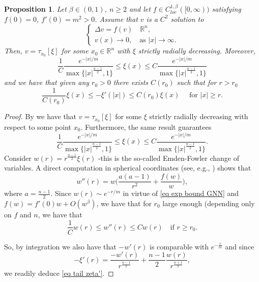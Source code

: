 \documentclass[11pt,letterpaper,reqno]{amsart}
\newcommand{\R}{\mathbb{R}}
\theoremstyle{plain}%
\newtheorem{proposition}[theorem]{Proposition}
\theoremstyle{definition}
\numberwithin{equation}{section}
\numberwithin{figure}{section}
\begin{document}
\begin{proposition}\label{prop radialuniqueness} 
    Let $\beta\in (0,1)$, $n\geq 2$ and let $f \in C_{loc}^{1,\beta}([0,\infty))$ satisfying $f(0)=0$, $f'(0)=m^2>0$. Assume that $v$ is a $C^2$ solution to
\begin{equation}\label{eq gsap0}
\begin{cases}
\Delta v = f(v) \quad  \R^n, \\
 v(x) \to 0, \quad  \text{as $|x| \to \infty$}.
\end{cases}
\end{equation} 
Then, $v=\tau_{x_0}[\xi]$ for some $x_0\in\R^n$ with $\xi$ strictly radially decreasing. Moreover, 
	\begin{equation}\label{eq tail zeta}
			\frac{1}{C} \frac{e^{-|x|/m}}{\max\{|x|^\frac{n-1}{2},1\}}	\leq  \xi(x) \leq C\frac{e^{-|x|/m}}{\max\{|x|^\frac{n-1}{2},1\}}
	\end{equation}
	and we have that given any $r_0>0$ there exists $C(r_0)$ such that for $r> r_0$
		\begin{equation}\label{eq tail zeta'} 
		\frac{1}{C(r_0)} \xi(x)\leq  -\xi'(|x|) \leq C(r_0)\xi(x) \quad \mbox{  for $|x|\geq r$}.
	\end{equation}
\end{proposition}
\begin{proof}
   By \cite[Theorem 2]{gidas1981symmetry} we have that $v=\tau_{x_0}[\xi]$ for some $\xi$ strictly radially decreasing with respect to some point $x_0$. Furthermore, the same result guarantees
	\begin{equation}\label{eq exp bound GNN}
		\frac{1}{C} \frac{e^{-|x|/m}}{\max\{|x|^\frac{n-1}{2},1\}}	\leq  \xi(x) \leq C \frac{e^{-|x|/m}}{\max\{|x|^\frac{n-1}{2},1\}}.
	\end{equation}
     Consider $w(r) = r^\frac{n-1}{2}\xi(r)$ -this is the so-called Emden-Fowler change of variables. A direct computation in spherical coordinates (see, e.g., \cite[(3-36)]{maggi2024uniform}) shows that
    \begin{equation}\label{eq EF}
w''(r) = w\Big(\frac{a(a-1)}{r^2}+\frac{f(w)}{w}\Big),
    \end{equation}
where $a= \frac{n-1}{2}$. Since  $w(r) \sim e^{-r/m}$ in virtue of \eqref{eq exp bound GNN} and $f(w)= f'(0)w+O(w^\beta)$, we have that for $r_0$ large enough (depending only on $f$ and $n$, we have that
	\begin{equation}\label{eq comparison w}
 \frac{1}{C}	w(r) \leq	w''(r) \leq C w(r) \quad \mbox{if $r\geq r_0$}.
	\end{equation}
	
	So, by integration we also have that $-w'(r)$ is comparable with $e^{-\frac{r}{m}}$ and since
	\begin{equation*}
		-\xi'(r) = \frac{-w'(r)}{r^\frac{n-1}{2}} +\frac{n-1}{2}\frac{w(r)}{r^\frac{n+1}{2}},
	\end{equation*}
	we readily deduce \eqref{eq tail zeta'}.
\end{proof}
\end{document}
